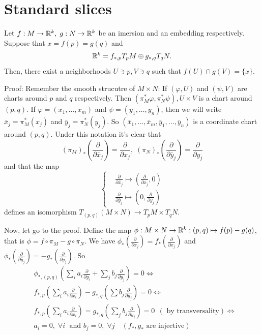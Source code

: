 \section{Standard slices}
\begin{dang}
    \begin{lemma}\label{lemma:transversality lemma}
        Let $f: M\to \mathbb{R}^k,\;g:N\to\mathbb{R}^k$ be an imersion and an embedding respectively. Suppose that 
        $x=f(p)=g(q)$ and 
        \begin{equation}
            \mathbb{R}^k = f_{*,p}T_pM\oplus g_{*,q}T_qN.
        \end{equation}
        Then, there exist a neighborhoods $U\ni p,V\ni q$ such that $f(U)\cap g(V)=\{x\}$.
    \end{lemma}
\end{dang}
Proof: Remember the smooth strucutre of $M\times N$: If $(\varphi,U)$ and $(\psi,V)$ are charts around $p$ and $q$ respectively. 
Then $(\pi_M^*\varphi,\pi_N^*\psi), U\times V$ is a chart around $(p,q)$. 
If $\varphi=(x_1,\dots,x_m)$ and $\psi=(y_1,\dots, y_n)$, then we will write $\bar{x}_j=\pi_M^*(x_j)$ and 
$\bar{y}_j=\pi_N^*(y_j)$. So $(\bar{x}_1,\dots,\bar{x}_m,\bar{y}_1,\dots,\bar{y}_n)$ is a coordinate chart around $(p,q)$. Under this notation 
it's clear that 
\begin{equation}
    (\pi_M)_{*}(\frac{\partial}{\partial\bar{x}_j})=\frac{\partial}{\partial x_j},\;
    (\pi_N)_{*}(\frac{\partial}{\partial\bar{y}_j})=\frac{\partial}{\partial y_j}
\end{equation}
and that the map 
\begin{equation}
    \left\{\begin{aligned}
        &\frac{\partial}{\partial\bar{x}_j}\mapsto (\frac{\partial}{\partial x_j},0)\\
        &\frac{\partial}{\partial\bar{y}_j}\mapsto (0,\frac{\partial}{\partial y_j})
    \end{aligned}\right.
\end{equation}
defines an isomorphism $T_{(p,q)}(M\times N)\to T_pM\times T_qN$.\par 
Now, let go to the proof. Define the map $\phi:M\times N\to \mathbb{R}^k:(p,q)\mapsto f(p)-g(q)$, that is 
$\phi=f\circ\pi_M-g\circ\pi_N$. We have $\phi_*(\frac{\partial}{\partial\bar{x}_j})=f_*(\frac{\partial}{\partial x_j})$ and 
$\phi_*(\tfrac{\partial}{\partial\bar{y}_j})=-g_*(\tfrac{\partial}{\partial y_j})$. So 
\begin{equation}
    \begin{split}
        &\phi_{*,(p,q)}(\sum_ia_i\frac{\partial}{\partial\bar{y}_i}+\sum_jb_j\frac{\partial}{\partial y_j})=0\iff\\
        &f_{*,p}(\sum_ia_i\frac{\partial}{\partial x_i})-g_{*,q}(\sum b_j\frac{\partial}{\partial y_j})=0\iff \\
        &f_{*,p}(\sum_ia_i\frac{\partial}{\partial x_i})=g_{*,q}(\sum_jb_j\frac{\partial}{\partial y_j})=0\,\;(\text{ by transversality})\iff\\
        &a_i=0,\;\forall i\;\text{ and }b_j=0,\;\forall j\quad(f_*,g_*\text{ are injective})
    \end{split}
\end{equation}
